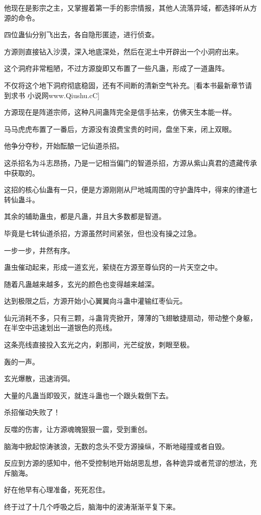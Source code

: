 \begin{this_body}
他现在是影宗之主，又掌握着第一手的影宗情报，其他人流落异域，都选择听从方源的命令。

四位蛊仙分别飞出去，各自隐形匿迹，进行侦查。

方源则直接钻入沙漠，深入地底深处，然后在泥土中开辟出一个小洞府出来。

这个洞府非常粗陋，不过方源旋即又布置了一些凡蛊，形成了一道蛊阵。

不仅将这个地下洞府彻底稳固，还有不间断的清新空气补充。[看本书最新章节请到求书 小说网www.Qiushu.cC]

方源现在是阵道宗师，这种凡间蛊阵完全是信手拈来，仿佛天生本能一样。

马马虎虎布置了一番后，方源没有浪费宝贵的时间，盘坐下来，闭上双眼。

他争分夺秒，开始酝酿一记仙道杀招。

这杀招名为斗志昂扬，乃是一记相当偏门的智道杀招，方源从紫山真君的遗藏传承中获取的。

这招的核心仙蛊有一只，便是方源刚刚从尸地城周围的守护蛊阵中，得来的律道七转仙蛊斗。

其余的辅助蛊虫，都是凡蛊，并且大多数都是智道。

毕竟是七转仙道杀招，方源虽然时间紧张，但也没有操之过急。

一步一步，井然有序。

蛊虫催动起来，形成一道玄光，萦绕在方源至尊仙窍的一片天空之中。

随着凡蛊越来越多，玄光的颜色也变得越来越深。

达到极限之后，方源开始小心翼翼向斗蛊中灌输红枣仙元。

仙元消耗不多，只有三颗，斗蛊背壳掀开，薄薄的飞翅敏捷扇动，带动整个身躯，在半空中迅速划出一道银色的亮线。

这条亮线直接投入玄光之内，刹那间，光芒绽放，刺眼至极。

轰的一声。

玄光爆散，迅速消弭。

大量的凡蛊当即毁灭，就连斗蛊也一个跟头栽倒下去。

杀招催动失败了！

反噬的伤害，让方源魂魄狠狠一震，受到重创。

脑海中掀起惊涛骇浪，无数的念头不受方源操纵，不断地碰撞或者自毁。

反应到方源的感知中，他不受控制地开始胡思乱想，各种诡异或者荒谬的想法，充斥脑海。

好在他早有心理准备，死死忍住。

终于过了十几个呼吸之后，脑海中的波涛渐渐平复下来。


\end{this_body}
